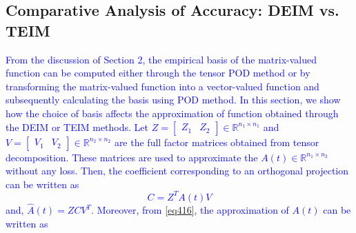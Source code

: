 \documentclass{article}
\begin{document}
\subsection{Comparative Analysis of Accuracy: DEIM vs. TEIM}\label{sec:ATD}
\textcolor{blue}{From the discussion of Section 2, the empirical basis of the matrix-valued function can be computed either through the tensor POD method or by transforming the matrix-valued function into a vector-valued function and subsequently calculating the basis using POD method. In this section, we show how the choice of basis affects the approximation of function obtained through the DEIM or TEIM methods.}
\textcolor{blue}{
Let $Z=\begin{bmatrix}
    Z_1 &Z_2 
\end{bmatrix} \in \mathbb{R}^{n_1 \times n_1}$ and $V=\begin{bmatrix}
    V_1 &V_2 
\end{bmatrix}\in \mathbb{R}^{n_2 \times n_2}$ are the full factor matrices obtained from tensor decomposition. These matrices are used to approximate the $A(t) \in \mathbb{R}^{n_1 \times n_2}$ without any loss. Then, the  coefficient corresponding to an orthogonal projection can be written as
\begin{equation}
    C=Z^TA(t)V
\end{equation}
and, $\hat{A}(t)=ZCV^T$. Moreover, from \eqref{eq416}, the approximation of $A(t)$ can be written as }
\end{document}
